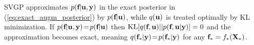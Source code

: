 \begin{remark}
 SVGP approximates $p(\textbf{f} | \textbf{u}, \textbf{y})$ in the exact posterior 
in (\ref{eq:exact_augm_posterior}) 
by %
$p(\textbf{f} | \textbf{u})$, %
while  $q(\textbf{u})$ is treated optimally by %
KL minimization. If 
$p(\textbf{f} | \textbf{u}, \textbf{y}) \! = \! p(\textbf{f} | \textbf{u})$ %
then $\text{KL}[q(\textbf{f}, \textbf{u}) || p(\textbf{f}, \textbf{u}|\textbf{y})]=0$ and the %
 approximation becomes exact, meaning $q(\textbf{f}_* | \textbf{y}) \! = \! p(\textbf{f}_* | \textbf{y})$ for any $\textbf{f}_* = f_*(\textbf{X}_*)$. 
\label{remark2}
\end{remark}







 










